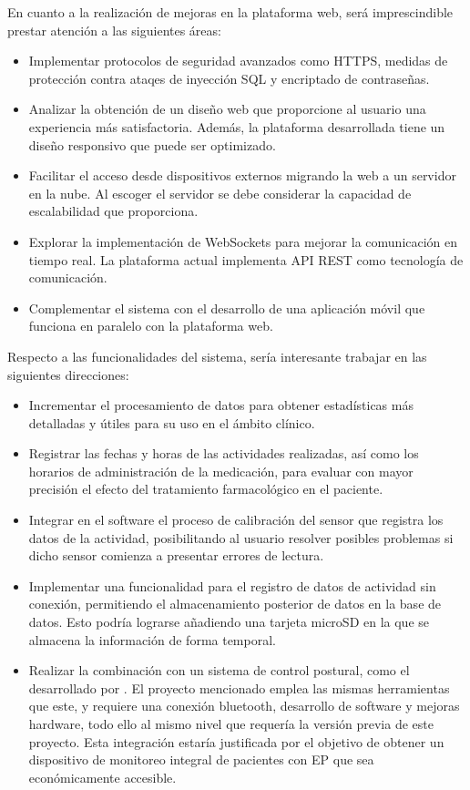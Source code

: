 En cuanto a la realización de mejoras en la plataforma web, será imprescindible prestar atención a las siguientes áreas:
\begin{itemize}
    \item Implementar protocolos de seguridad avanzados como HTTPS, medidas de protección contra ataqes de inyección SQL y encriptado de contraseñas.
    \item Analizar la obtención de un diseño web que proporcione al usuario una experiencia más satisfactoria. Además, la plataforma desarrollada tiene un diseño responsivo que puede ser optimizado.
    \item Facilitar el acceso desde dispositivos externos migrando la web a un servidor en la nube. Al escoger el servidor se debe considerar la capacidad de escalabilidad que proporciona.
    \item Explorar la implementación de WebSockets para mejorar la comunicación en tiempo real. La plataforma actual implementa API REST como tecnología de comunicación.
    \item Complementar el sistema con el desarrollo de una aplicación móvil que funciona en paralelo con la plataforma web.
\end{itemize}

Respecto a las funcionalidades del sistema, sería interesante trabajar en las siguientes direcciones:
\begin{itemize}
    \item Incrementar el procesamiento de datos para obtener estadísticas más detalladas y útiles para su uso en el ámbito clínico.
    \item Registrar las fechas y horas de las actividades realizadas, así como los horarios de administración de la medicación, para evaluar con mayor precisión el efecto del tratamiento farmacológico en el paciente.
    \item Integrar en el software el proceso de calibración del sensor que registra los datos de la actividad, posibilitando al usuario resolver posibles problemas si dicho sensor comienza a presentar errores de lectura.
    \item Implementar una funcionalidad para el registro de datos de actividad sin conexión, permitiendo el almacenamiento posterior de datos en la base de datos. Esto podría lograrse añadiendo una tarjeta microSD en la que se almacena la información de forma temporal.
    \item Realizar la combinación con un sistema de control postural, como el desarrollado por \cite{NaiaraGa53:online}. El proyecto mencionado emplea las mismas herramientas que este, y requiere una conexión bluetooth, desarrollo de software y mejoras hardware, todo ello al mismo nivel que requería la versión previa de este proyecto. Esta integración estaría justificada por el objetivo de obtener un dispositivo de monitoreo integral de pacientes con EP que sea económicamente accesible.
\end{itemize}


